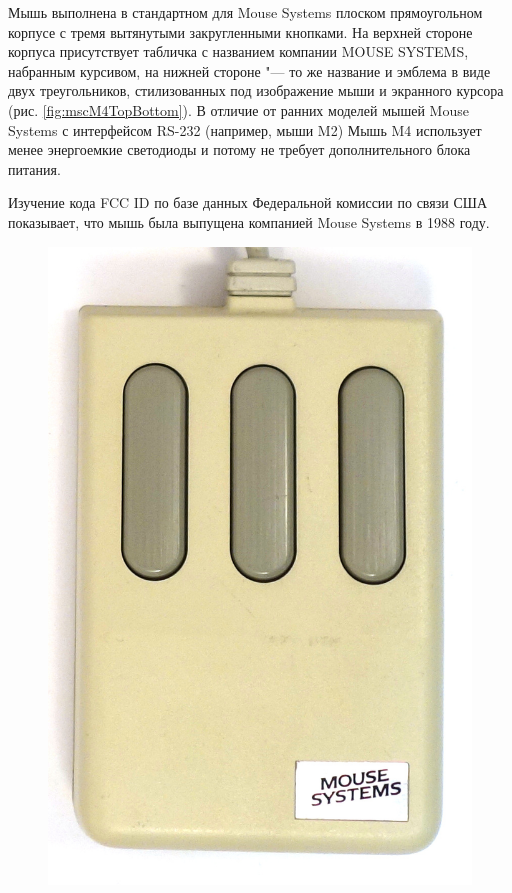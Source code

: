\documentclass[11pt, a4paper]{article}
\begin{document}
Мышь выполнена в стандартном для Mouse Systems плоском прямоугольном корпусе с тремя вытянутыми закругленными кнопками. На верхней стороне корпуса присутствует табличка с названием компании MOUSE SYSTEMS, набранным курсивом, на нижней стороне "--- то же название и эмблема в виде двух треугольников, стилизованных под изображение мыши и экранного курсора (рис. \ref{fig:mscM4TopBottom}). В отличие от ранних моделей мышей Mouse Systems с интерфейсом RS-232 (например, мыши M2) Мышь M4 использует менее энергоемкие светодиоды и потому не требует дополнительного блока питания.

Изучение кода FCC ID по базе данных Федеральной комиссии по связи США показывает, что мышь была выпущена компанией Mouse Systems в 1988 году.

\begin{figure}[h]
    \centering
    \includegraphics[scale=0.6]{1988_mouse_systems_m4/top_30.jpg}

\end{figure}
\end{document}
